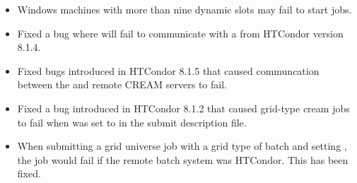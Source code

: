 \begin{itemize}

\item Windows machines with more than nine dynamic slots may fail to start jobs.

\item Fixed a bug where  will fail to communicate with a
 from HTCondor version 8.1.4.

\item Fixed bugs introduced in HTCondor 8.1.5 that caused communcation
between the  and remote CREAM servers to fail.

\item Fixed a bug introduced in HTCondor 8.1.2 that caused grid-type
cream jobs to fail when  was set to 
in the submit description file.

\item When submitting a grid universe job with a grid type of batch and
setting , the job would fail if the remote
batch system was HTCondor. This has been fixed.

\end{itemize}

